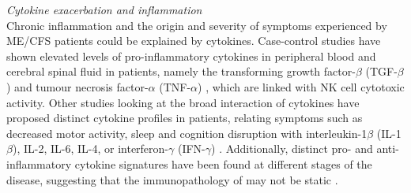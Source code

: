 \bsni
\textit{Cytokine exacerbation and inflammation}\\
\noindent
Chronic inflammation and the origin and severity of symptoms experienced by ME/CFS patients could be explained by cytokines.
Case-control studies have shown elevated levels of pro-inflammatory cytokines in peripheral blood and cerebral spinal fluid in patients, namely the transforming growth factor-${\beta}$ (TGF-${\beta}$) \citep{montoyaCytokineSignatureAssociated2017} and tumour necrosis factor-${\alpha}$ (TNF-${\alpha}$) \citep{brenuImmunologicalAbnormalitiesPotential2011}, which are linked with NK cell cytotoxic activity.
Other studies looking at the broad interaction of cytokines have proposed distinct cytokine profiles in patients, relating symptoms such as decreased motor activity, sleep and cognition disruption with interleukin-1${\beta}$ (IL-1${\beta}$), IL-2, IL-6, IL-4, or interferon-${\gamma}$ (IFN-${\gamma}$) \citep{broderick2010FormalAnalysis}.
Additionally, distinct pro- and anti-inflammatory cytokine signatures have been found at different stages of the disease, suggesting that the immunopathology of \cfs may not be static \citep{hornig2015DistinctPlasma}.


